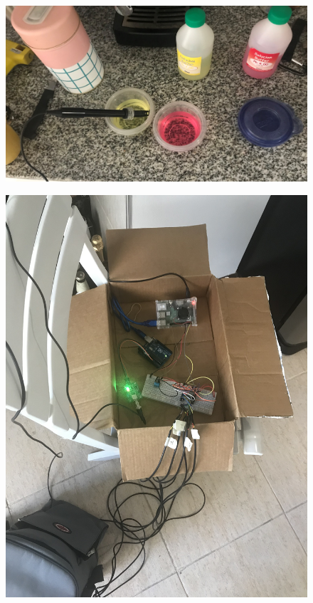     \begin{figure}
        \centering
        \includegraphics[scale=0.10]{Anexo/FotosExperimentos/P6.jpg}
        \label{fig:CalibrPhimetro}
    \end{figure}
        
    \begin{figure}
        \centering
        \includegraphics[scale=0.1]{Anexo/FotosExperimentos/P7.jpg}
        \label{fig:MontajeSist}
    \end{figure}
    
